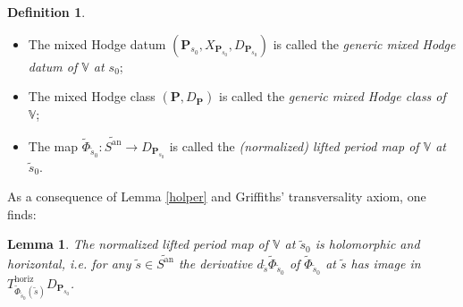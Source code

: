 \documentclass[10pt]{article}
\numberwithin{equation}{subsection}
\theoremstyle{plain}
\newtheorem{lemma}[theorem]{Lemma}
\theoremstyle{definition}
\newtheorem{definition}[theorem]{Definition}
\theoremstyle{remark}
\newcommand{\C}{\mathbb C}
\newcommand{\R}{\mathbb R}
\newcommand{\V}{\mathbb V}
\newcommand{\pp}{\mathbf P}
\newcommand{\bul}{\bullet}
\newcommand{\an}{\mathrm{an}}
\begin{document}
\begin{definition}
\begin{itemize}
\item[(a)] The mixed Hodge datum $(\pp_{s_0}, X_{\pp_{s_0}}, D_{\pp_{s_0}})$ is called the \textit{generic mixed Hodge datum of $\V$ at $s_0$};
\item[(b)] The mixed Hodge class $(\pp,D_\pp)$ is called the \textit{generic mixed Hodge class of $\V$};
\item[(c)] The map $\tilde{\Phi}_{\tilde{s}_0} : \widetilde{S^\an} \rightarrow D_{\pp_{s_0}}$ is called the \textit{(normalized) lifted period map of $\V$ at $\tilde{s}_0$}.
\end{itemize}
\end{definition}
As a consequence of Lemma \ref{holper} and Griffiths' transversality axiom, one finds:
\begin{lemma}\label{holpernorm}
The normalized lifted period map of $\V$ at $\tilde{s}_0$ is holomorphic and horizontal, i.e. for any $\tilde{s} \in \widetilde{S^\an}$ the derivative $d_{\tilde{s}} \tilde{\Phi}_{\tilde{s}_0}$ of $\tilde{\Phi}_{\tilde{s}_0}$ at $\tilde{s}$ has image in $T_{\tilde{\Phi}_{\tilde{s}_0}(\tilde{s})}^{\mathrm{horiz}} D_{\pp_{s_0}}$.
\end{lemma}
\end{document}
